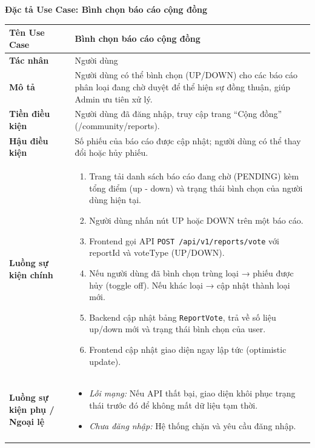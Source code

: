 \documentclass[12pt,a4paper]{article}
\begin{document}
\vspace{0.5cm}
\textbf{Đặc tả Use Case: Bình chọn báo cáo cộng đồng}

\begin{center}
\renewcommand{\arraystretch}{1.4}
\begin{tabular}{|p{4cm}|p{10cm}|}
\hline
\rowcolor{blue!15}
\textbf{Tên Use Case} & \textbf{Bình chọn báo cáo cộng đồng} \\ \hline
\textbf{Tác nhân} & Người dùng \\ \hline
\textbf{Mô tả} & Người dùng có thể bình chọn (UP/DOWN) cho các báo cáo phân loại đang chờ duyệt để thể hiện sự đồng thuận, giúp Admin ưu tiên xử lý. \\ \hline
\textbf{Tiền điều kiện} & Người dùng đã đăng nhập, truy cập trang “Cộng đồng” (/community/reports). \\ \hline
\textbf{Hậu điều kiện} & Số phiếu của báo cáo được cập nhật; người dùng có thể thay đổi hoặc hủy phiếu. \\ \hline
\textbf{Luồng sự kiện chính} & 
\begin{enumerate}
    \item Trang tải danh sách báo cáo đang chờ (PENDING) kèm tổng điểm (up - down) và trạng thái bình chọn của người dùng hiện tại.
    \item Người dùng nhấn nút UP hoặc DOWN trên một báo cáo.
    \item Frontend gọi API \texttt{POST /api/v1/reports/vote} với reportId và voteType (UP/DOWN).
    \item Nếu người dùng đã bình chọn trùng loại → phiếu được hủy (toggle off). Nếu khác loại → cập nhật thành loại mới.
    \item Backend cập nhật bảng \texttt{ReportVote}, trả về số liệu up/down mới và trạng thái bình chọn của user.
    \item Frontend cập nhật giao diện ngay lập tức (optimistic update).
\end{enumerate} \\ \hline
\textbf{Luồng sự kiện phụ / Ngoại lệ} & 
\begin{itemize}
    \item \textit{Lỗi mạng:} Nếu API thất bại, giao diện khôi phục trạng thái trước đó để không mất dữ liệu tạm thời.
    \item \textit{Chưa đăng nhập:} Hệ thống chặn và yêu cầu đăng nhập.
\end{itemize} \\ \hline
\end{tabular}
\end{center}
\end{document}
